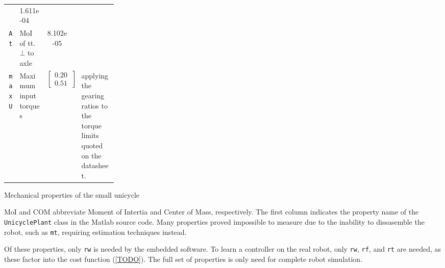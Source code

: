 {\begin{tabularx}{\linewidth}{
	@{}
	r
	>{\raggedright}p{0.25\linewidth}
	S[
		scientific-notation = engineering,
		table-format=-3e-1,
		table-auto-round
	]
	s
	X
	@{}
}
		& 1.611e-04 & \kilogram \square\meter
		&
	\\
	\texttt{At}
		& MoI of tt. $\bot$ to axle
		& 8.102e-05 & \kilogram \square\meter
		& 
	\\
\midrule
	\texttt{maxU}
		& Maximum input torques
		& {
			\renewcommand{\arraystretch}{1}
			$\begin{bmatrix}0.205 \\ 0.513\end{bmatrix}$
		} & \newton \meter
		& applying the gearing ratios\cite{gearbox} to the torque limits quoted on the datasheet\cite{motor}.
	\\
\bottomrule
\end{tabularx}
}

\caption{Mechanical properties of the small unicycle}
\medskip
\small
MoI and COM abbreviate Moment of Intertia and Center of Mass, respectively.
The first column indicates the property name of the \texttt{UnicyclePlant} class in the Matlab source code.
Many properties proved impossible to measure due to the inability to dissasemble the robot, such as \texttt{mt}, requiring estimation techniques instead.

\medskip
Of these properties, only \texttt{rw} is needed by the embedded software.
To learn a controller on the real robot, only \texttt{rw}, \texttt{rf}, and \texttt{rt} are needed, as these factor into the cost function (\cref{TODO}).
The full set of properties is only need for complete robot simulation.


